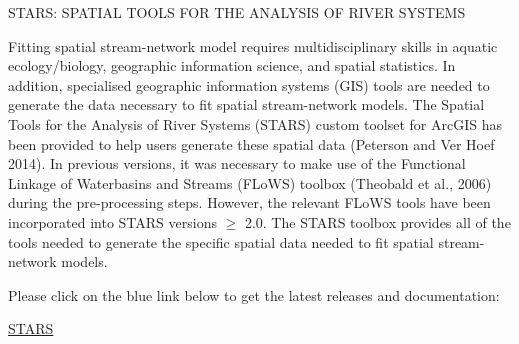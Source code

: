 \documentclass{article}\usepackage[]{graphicx}\usepackage[]{xcolor}
\begin{document}
\begin{center}
{\Large STARS: SPATIAL TOOLS FOR THE ANALYSIS OF RIVER SYSTEMS}
\end{center}

Fitting spatial stream-network model requires multidisciplinary skills
in aquatic ecology/biology, geographic information science, and
spatial statistics. In addition, specialised geographic information
systems (GIS) tools are needed to generate the data necessary to fit
spatial stream-network models. The Spatial Tools for the Analysis of
River Systems (STARS) custom toolset for ArcGIS has been provided to
help users generate these spatial data (Peterson and Ver Hoef
2014). In previous versions, it was necessary to make use of the
Functional Linkage of Waterbasins and Streams (FLoWS) toolbox
(Theobald et al., 2006) during the pre-processing steps. However, the
relevant FLoWS tools have been incorporated into STARS versions $\ge$
2.0. The STARS toolbox provides all of the tools needed to generate
the specific spatial data needed to fit spatial stream-network models.

\vspace{.2cm}
\noindent Please click on the blue link below to get the latest releases and documentation:


\begin{center}
	\href{https://www.fs.usda.gov/rm/boise/AWAE/projects/SSN_STARS/software_data.html#STARS}{\Large STARS}
\end{center}
\end{document}
